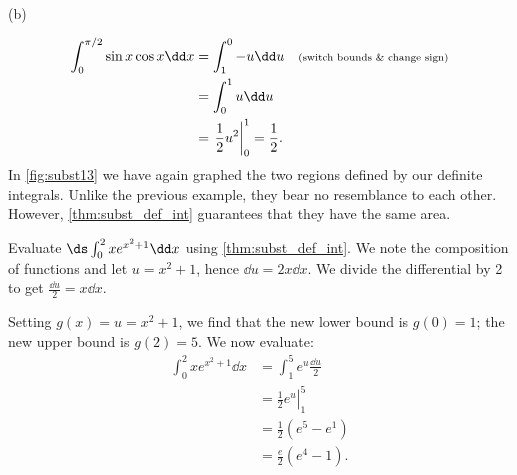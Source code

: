 \begin{example}
{\begin{tikzpicture}[alt={Graph (b) blue line y = u; area under line shaded from u = 0 to 1; axes u and y.}]
\end{tikzpicture}
\\(b)}
%
\begin{align*}
	\int_0^{\pi/2} \sin x\cos x\dd x
	&= \int_1^0 -u\dd u && \text{\scriptsize (switch bounds \& change sign)}\\
	&= \int_0^1 u\dd u\\
	&= \left.\frac12u^2\right|_0^1= \frac12.
\end{align*}
In \autoref{fig:subst13} we have again graphed the two regions defined by our definite integrals. Unlike the previous example, they bear no resemblance to each other. However, \autoref{thm:subst_def_int} guarantees that they have the same area.
\end{example}

\begin{example}\label{ex_subst_def_3}%
Evaluate $\ds\int_0^2 xe^{x^2+1}\dd x$ using \autoref{thm:subst_def_int}.
\solution
We note the composition of functions and let $u=x^2+1$, hence $\dd u=2x\dd x$. We divide the differential by 2 to get $\frac{\dd u}2=x\dd x$.

Setting $g(x)=u=x^2+1$, we find that the new lower bound is $g(0)=1$; the new upper bound is $g(2)=5$. We now evaluate:
\begin{align*}
	\int_0^2 xe^{x^2+1}\dd x
	&= \int_1^5 e^u \frac{\dd u}2\\
	&= \left.\frac12 e^u\right|_1^5\\
	&= \frac12(e^5-e^1) \\
	&= \frac e2(e^4-1). %
\end{align*}
\end{example}



